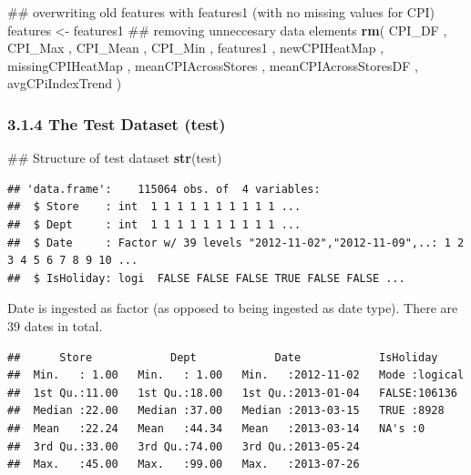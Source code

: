 \documentclass[]{article}
\newenvironment{Shaded}{\begin{snugshade}}{\end{snugshade}}
\newcommand{\KeywordTok}[1]{\textcolor[rgb]{0.13,0.29,0.53}{\textbf{{#1}}}}
\newcommand{\StringTok}[1]{\textcolor[rgb]{0.31,0.60,0.02}{{#1}}}
\newcommand{\NormalTok}[1]{{#1}}
\begin{document}
\begin{Shaded}
\begin{Highlighting}[]
\NormalTok{## overwriting old features with features1 (with no missing values for CPI)}
\NormalTok{features <-}\StringTok{ }\NormalTok{features1}
\NormalTok{## removing unneccesary data elements}
\KeywordTok{rm}\NormalTok{( CPI_DF , CPI_Max , CPI_Mean , CPI_Min , }
    \NormalTok{features1 , newCPIHeatMap , missingCPIHeatMap ,}
    \NormalTok{meanCPIAcrossStores , meanCPIAcrossStoresDF , avgCPiIndexTrend )}
\end{Highlighting}
\end{Shaded}

\subsubsection{3.1.4 The Test Dataset
(test)}\label{the-test-dataset-test}

\begin{Shaded}
\begin{Highlighting}[]
\NormalTok{## Structure of test dataset}
\KeywordTok{str}\NormalTok{(test)}
\end{Highlighting}
\end{Shaded}

\begin{verbatim}
## 'data.frame':    115064 obs. of  4 variables:
##  $ Store    : int  1 1 1 1 1 1 1 1 1 1 ...
##  $ Dept     : int  1 1 1 1 1 1 1 1 1 1 ...
##  $ Date     : Factor w/ 39 levels "2012-11-02","2012-11-09",..: 1 2 3 4 5 6 7 8 9 10 ...
##  $ IsHoliday: logi  FALSE FALSE FALSE TRUE FALSE FALSE ...
\end{verbatim}

Date is ingested as factor (as opposed to being ingested as date type).
There are 39 dates in total.

\begin{Shaded}
\end{Shaded}

\begin{verbatim}
##      Store            Dept            Date            IsHoliday      
##  Min.   : 1.00   Min.   : 1.00   Min.   :2012-11-02   Mode :logical  
##  1st Qu.:11.00   1st Qu.:18.00   1st Qu.:2013-01-04   FALSE:106136   
##  Median :22.00   Median :37.00   Median :2013-03-15   TRUE :8928     
##  Mean   :22.24   Mean   :44.34   Mean   :2013-03-14   NA's :0        
##  3rd Qu.:33.00   3rd Qu.:74.00   3rd Qu.:2013-05-24                  
##  Max.   :45.00   Max.   :99.00   Max.   :2013-07-26
\end{verbatim}
\end{document}
